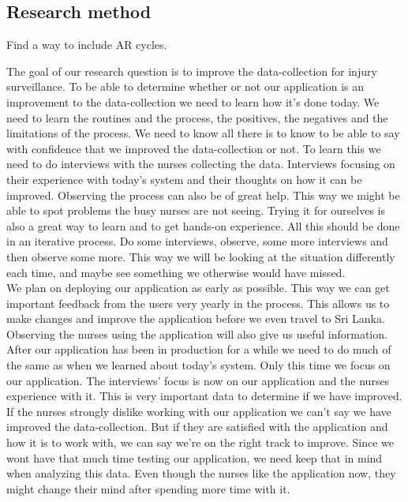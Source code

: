 \documentclass[UKenglish, 12pt]{article}
\newcommand{\is}{injury surveillance}
\begin{document}
\subsection*{Research method} %

Find a way to include AR cycles.

The goal of our research question is to improve the data-collection for \is. To
be able to determine whether or not our application is an improvement to the
data-collection we need to learn how it's done today. We need to learn the
routines and the process, the positives, the negatives and the limitations of
the process. We need to know all there is to know to be able to say with
confidence that we improved the data-collection or not. To learn this we need to
do interviews with the nurses collecting the data. Interviews focusing on their
experience with today's system and their thoughts on how it can be improved.
Observing the process can also be of great help. This way we might be able
to spot problems the busy nurses are not seeing.  Trying it for ourselves is
also a great way to learn and to get hands-on experience. All this should be
done in an iterative process. Do some interviews, observe, some more
interviews and then observe some more. This way we will be looking at the
situation differently each time, and maybe see something we otherwise would
have missed.\\

We plan on deploying our application as early as possible. This way we can get
important feedback from the users very yearly in the process. This allows us to
make changes and improve the application before we even travel to Sri Lanka.
Observing the nurses using the application will also give us useful
information.\\

After our application has been in production for a while we need to do much of
the same as when we learned about today's system. Only this time we focus on our
application. The interviews' focus is now on our application and the nurses
experience with it. This is very important data to determine if we have
improved. If the nurses strongly dislike working with our application we can't
say we have improved the data-collection.  But if they are satisfied with the
application and how it is to work with, we can say we're on the right track to
improve. Since we wont have that much time testing our application, we need keep
that in mind when analyzing this data.  Even though the nurses like the
application now, they might change their mind after spending more time with
it.\\
\end{document}
